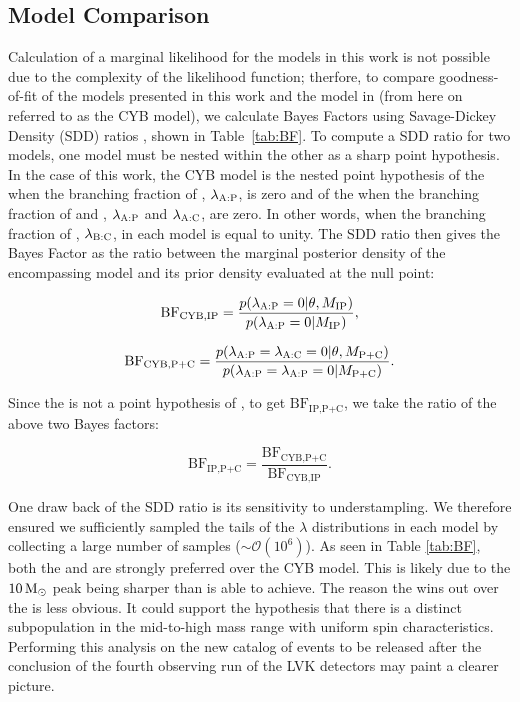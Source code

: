 \subsection{Model Comparison}

Calculation of a marginal likelihood for the models in this work is not possible due to the complexity of the likelihood function; therfore, to compare goodness-of-fit of the models presented in this work and the model in \brucepaper (from here on referred to as the CYB model), we calculate Bayes Factors using Savage-Dickey Density (SDD) ratios \citep{10.1371/journal.pone.0059655, 10.29220/CSAM.2019.26.2.217}, shown in Table~\ref{tab:BF}. To compute a SDD ratio for two models, one model must be nested within the other as a sharp point hypothesis. In the case of this work, the CYB model is the nested point hypothesis of the \base{} when the branching fraction of \first{}, $\lambda_\textsc{A:P}$, is zero and of the \comp{} when the branching fraction of \first{} and \contA{}, $\lambda_\textsc{A:P}$ and $\lambda_\textsc{A:C}$, are zero. In other words, when the branching fraction of \contB{}, $\lambda_\textsc{B:C}$, in each model is equal to unity. The SDD ratio then gives the Bayes Factor as the ratio between the marginal posterior density of the encompassing model and its prior density evaluated at the null point:



\begin{equation} \label{eq:BF1}
\text{BF}_{\text{CYB,IP}} = \frac{p(\lambda_\textsc{A:P} = 0 | \theta, M_\text{IP})}{p(\lambda_\textsc{A:P} = 0 | M_\text{IP})},
\end{equation}

\begin{equation}\label{eq:BF2}
  \text{BF}_{\text{CYB,P+C}} = \frac{p(\lambda_\textsc{A:P} = \lambda_\textsc{A:C}= 0 | \theta, M_\text{P+C})}{p(\lambda_\textsc{A:P} = \lambda_\textsc{A:P} = 0 | M_\text{P+C})}.
\end{equation}

Since the \base{} is not a point hypothesis of \comp{}, to get $\text{BF}_\text{IP,P+C}$, we take the ratio of the above two Bayes factors:

\begin{equation}\label{eq:BF1}
  \text{BF}_\text{IP,P+C} = \frac{\text{BF}_{\text{CYB,P+C}}}{\text{BF}_{\text{CYB,IP}}}.
\end{equation}

One draw back of the SDD ratio is its sensitivity to understampling. We therefore ensured we sufficiently sampled the tails of the $\lambda$ distributions in each model by collecting a large number of samples ($\sim\mathcal{O}(10^6)$). 
As seen in Table \ref{tab:BF}, both the \base{} and \comp{} are strongly preferred over the CYB model. This is likely due to the $10{\,\rm M}_\odot$ peak being sharper than \contB{} is able to achieve. The reason the \comp{} wins out over the \base{} is less obvious. It could support the hypothesis that there is a distinct subpopulation in the mid-to-high mass range with uniform spin characteristics. Performing this analysis on the new catalog of events to be released after the conclusion of the fourth observing run of the LVK detectors may paint a clearer picture.

